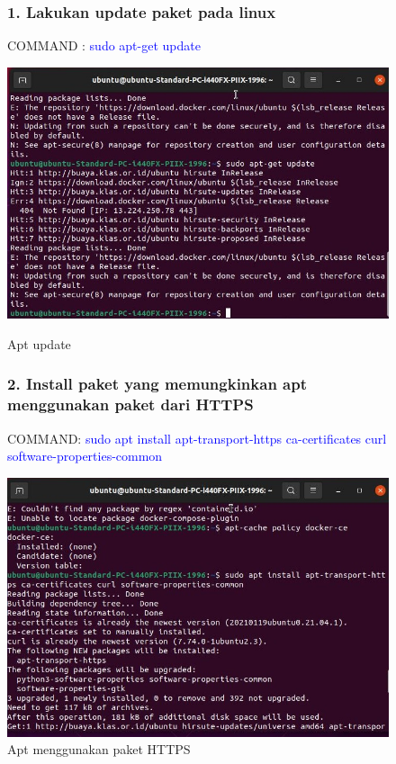 \begin{figure}
\subsubsection{1. Lakukan update paket pada linux} 
COMMAND : \textcolor{Blue}{sudo apt-get update}
        \begin{center}
          \includegraphics[width=\linewidth]{image/2.jpg}
          \caption{Apt update}
          \label{fig:my_figure}
        \end{center}
\subsubsection{2. Install paket yang memungkinkan apt menggunakan paket dari HTTPS}
COMMAND: \textcolor{Blue}{sudo apt install apt-transport-https ca-certificates curl software-properties-common}
        \begin{center}
          \includegraphics[width=\linewidth]{image/3.jpg}
          \caption{Apt menggunakan paket HTTPS}
          \label{fig:my_figure}
        \end{center}
\end{figure}

